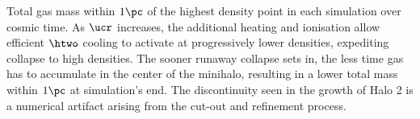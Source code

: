 \label{fig:collapse}
Total gas mass within $1\pc$ of the highest density point in each simulation over cosmic time.
As $\ucr$ increases, the additional heating and ionisation allow efficient $\htwo$ cooling to activate at progressively lower densities, expediting collapse to high densities.  
The sooner runaway collapse sets in, the less time gas has to accumulate in the center of the minihalo, resulting in a lower total mass within $1\pc$ at simulation's end.
The discontinuity seen in the growth of Halo 2 is a numerical artifact arising from the cut-out and refinement process.